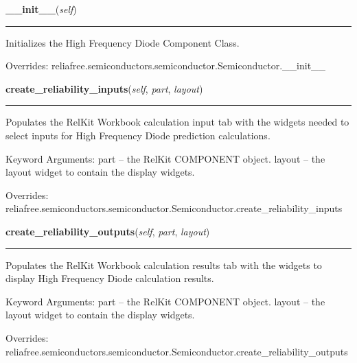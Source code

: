 \hspace{.8\funcindent}\begin{boxedminipage}{\funcwidth}

    \raggedright \textbf{\_\_init\_\_}(\textit{self})

    \vspace{-1.5ex}

    \rule{\textwidth}{0.5\fboxrule}
\setlength{\parskip}{2ex}
    Initializes the High Frequency Diode Component Class.

\setlength{\parskip}{1ex}
      Overrides: reliafree.semiconductors.semiconductor.Semiconductor.\_\_init\_\_

    \end{boxedminipage}

    \vspace{0.5ex}

\hspace{.8\funcindent}\begin{boxedminipage}{\funcwidth}

    \raggedright \textbf{create\_reliability\_inputs}(\textit{self}, \textit{part}, \textit{layout})

    \vspace{-1.5ex}

    \rule{\textwidth}{0.5\fboxrule}
\setlength{\parskip}{2ex}
    Populates the RelKit Workbook calculation input tab with the widgets
    needed to select inputs for High Frequency Diode prediction 
    calculations.

    Keyword Arguments: part   -- the RelKit COMPONENT object. layout -- 
    the layout widget to contain the display widgets.

\setlength{\parskip}{1ex}
      Overrides: reliafree.semiconductors.semiconductor.Semiconductor.create\_reliability\_inputs

    \end{boxedminipage}

    \vspace{0.5ex}

\hspace{.8\funcindent}\begin{boxedminipage}{\funcwidth}

    \raggedright \textbf{create\_reliability\_outputs}(\textit{self}, \textit{part}, \textit{layout})

    \vspace{-1.5ex}

    \rule{\textwidth}{0.5\fboxrule}
\setlength{\parskip}{2ex}
    Populates the RelKit Workbook calculation results tab with the 
    widgets to display High Frequency Diode calculation results.

    Keyword Arguments: part   -- the RelKit COMPONENT object. layout -- 
    the layout widget to contain the display widgets.

\setlength{\parskip}{1ex}
      Overrides: reliafree.semiconductors.semiconductor.Semiconductor.create\_reliability\_outputs

    \end{boxedminipage}

